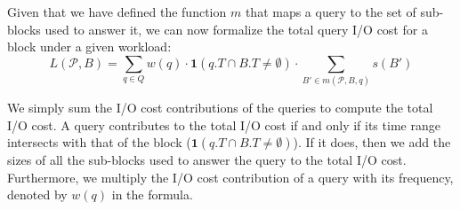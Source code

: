 Given that we have defined the function $m$ that maps a query to the set of 
sub-blocks used to answer it, we can now formalize the total query I/O cost
for a block under a given workload:
\begin{equation}
L(\mathcal{P}, B) = \sum_{q\in Q} w(q)\cdot\mathbf{1}(q.T \cap B.T \neq \emptyset) \cdot \sum_{B'\in m(\mathcal{P}, B, q)} \!\!s(B')
\end{equation}

We simply sum the I/O cost contributions of the queries to compute the total
I/O cost. A query contributes to the total I/O cost if and only if its time
range intersects with that of the block ($\mathbf{1}(q.T \cap B.T \neq
\emptyset)$). If it does, then we add the sizes of all the sub-blocks used to
answer the query to the total I/O cost. Furthermore, we multiply the I/O cost
contribution of a query with its frequency, denoted by $w(q)$ in the formula.



